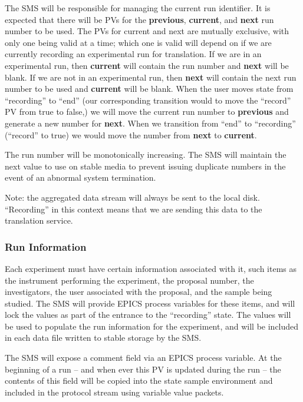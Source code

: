 The SMS will be responsible for managing the current run identifier. It is
expected that there will be PVs for the {\bf previous}, {\bf current}, and {\bf
next} run number to be used. The PVs for current and next are mutually
exclusive, with only one being valid at a time; which one is valid will depend
on if we are currently recording an experimental run for translation. If we are
in an experimental run, then {\bf current} will contain the run number and {\bf
next} will be blank. If we are not in an experimental run, then {\bf next} will
contain the next run number to be used and {\bf current} will be blank. When
the user moves state from ``recording'' to ``end'' (our corresponding
transition would to move the ``record'' PV from true to false,) we will move
the current run number to {\bf previous} and generate a new number for {\bf
next}. When we transition from ``end'' to ``recording'' (``record'' to true) we
would move the number from {\bf next} to {\bf current}.

The run number will be monotonically increasing. The SMS will maintain
the next value to use on stable media to prevent issuing duplicate numbers
in the event of an abnormal system termination.

\addvspace{\baselineskip}
\noindent
Note: the aggregated data stream will always be sent to the local disk.
``Recording'' in this context means that we are sending this data to the
translation service.

\subsubsection{Run Information}

Each experiment must have certain information associated with it, such items as
the instrument performing the experiment, the proposal number, the
investigators, the user associated with the proposal, and the sample being
studied. The SMS will provide EPICS process variables for these items, and will
lock the values as part of the entrance to the ``recording'' state. The values
will be used to populate the run information for the experiment, and will be
included in each data file written to stable storage by the SMS.

The SMS will expose a comment field via an EPICS process variable. At
the beginning of a run -- and when ever this PV is updated during the run --
the contents of this field will be copied into the state sample environment
and included in the protocol stream using variable value packets.


